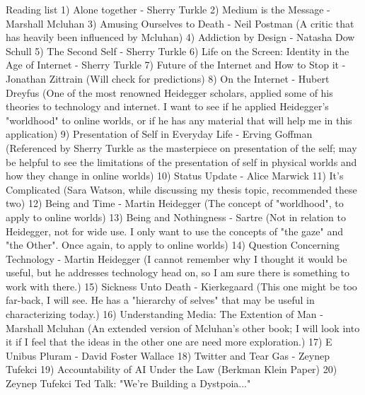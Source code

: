 Reading list
1) Alone together - Sherry Turkle
2) Medium is the Message - Marshall Mcluhan
3) Amusing Ourselves to Death - Neil Postman (A critic that has heavily been influenced by Mcluhan)
4) Addiction by Design - Natasha Dow Schull
5) The Second Self - Sherry Turkle
6) Life on the Screen: Identity in the Age of Internet - Sherry Turkle
7) Future of the Internet and How to Stop it - Jonathan Zittrain (Will check for predictions)
8) On the Internet - Hubert Dreyfus (One of the most renowned Heidegger scholars, applied some of his theories to technology and internet. 
I want to see if he applied Heidegger's "worldhood" to online worlds, or if he has any material that will help me in this application)
9) Presentation of Self in Everyday Life - Erving Goffman (Referenced by Sherry Turkle as the masterpiece on presentation of the self; may
be helpful to see the limitations of the presentation of self in physical worlds and how they change in online worlds)
10) Status Update - Alice Marwick
11) It's Complicated (Sara Watson, while discussing my thesis topic, recommended these two)
12) Being and Time - Martin Heidegger (The concept of "worldhood", to apply to online worlds)
13) Being and Nothingness - Sartre (Not in relation to Heidegger, not for wide use. I only want to use the concepts of "the gaze" and 
"the Other". Once again, to apply to online worlds)
14) Question Concerning Technology - Martin Heidegger (I cannot remember why I thought it would be useful, but he addresses technology head on,
so I am sure there is something to work with there.)
15) Sickness Unto Death - Kierkegaard (This one might be too far-back, I will see. He has a "hierarchy of selves" that may be useful in
characterizing today.)
16) Understanding Media: The Extention of Man - Marshall Mcluhan (An extended version of Mcluhan's other book; I will look into it if 
I feel that the ideas in the other one are need more exploration.)
17) E Unibus Pluram - David Foster Wallace
18) Twitter and Tear Gas - Zeynep Tufekci
19) Accountability of AI Under the Law (Berkman Klein Paper)
20) Zeynep Tufekci Ted Talk: "We're Building a Dystpoia..." 
